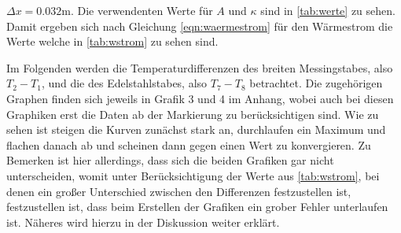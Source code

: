 $\Delta x = 0.032$m. 
Die verwendenten Werte für $A$ und $\kappa$ sind in \autoref{tab:werte} zu sehen.
Damit ergeben sich nach Gleichung \eqref{eqn:waermestrom} für den Wärmestrom die Werte welche in \autoref{tab:wstrom} zu sehen sind.



Im Folgenden werden die Temperaturdifferenzen des breiten Messingstabes, also $T_2-T_1$, und die des Edelstahlstabes, also $T_7 - T_8$ betrachtet. Die 
zugehörigen Graphen finden sich jeweils in Grafik 3 und 4 im Anhang, wobei auch bei diesen Graphiken erst die Daten ab der Markierung zu berücksichtigen sind.
Wie zu sehen ist steigen die Kurven zunächst stark an, durchlaufen ein Maximum und flachen danach ab und scheinen dann gegen einen Wert zu konvergieren.
Zu Bemerken ist hier allerdings, dass sich die beiden Grafiken gar nicht unterscheiden, womit unter Berücksichtigung der Werte aus \autoref{tab:wstrom}, bei denen 
ein großer Unterschied zwischen den Differenzen festzustellen ist, festzustellen ist, dass beim Erstellen der Grafiken ein grober Fehler unterlaufen ist.
Näheres wird hierzu in der Diskussion weiter erklärt.

